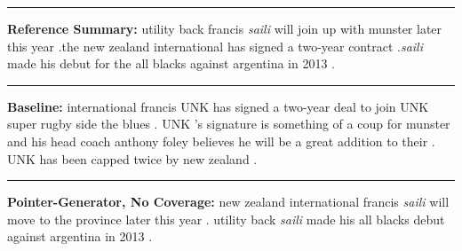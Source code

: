 \documentclass[11pt,a4paper]{article}
\begin{document}
\begin{figure*}
\begin{boxedminipage}{\textwidth}
                                                            
\newline \rule{\columnwidth}{0.4pt}
\textbf{Reference Summary:} \newline utility back francis \textit{saili} will join up with munster later this year .\newline the new zealand international has signed a two-year contract .\newline \textit{saili} made his debut for the all blacks against argentina in 2013 .
\newline \rule{\columnwidth}{0.4pt}
\textbf{Baseline:} \newline
{} international francis UNK has signed a two-year deal to join  UNK super rugby side the blues .\newline
UNK 's signature is something of a coup for munster and his head coach anthony foley believes he will be a great addition to their  . \newline
UNK has been capped twice by new zealand .
\newline \rule{\columnwidth}{0.4pt}
\textbf{Pointer-Generator, No Coverage:} \newline
new zealand international francis \textit{saili} will move to the province later this year .\newline
utility back \textit{saili} made his all blacks debut against argentina in 2013 .\newline

\end{boxedminipage}
\end{figure*}
\end{document}
